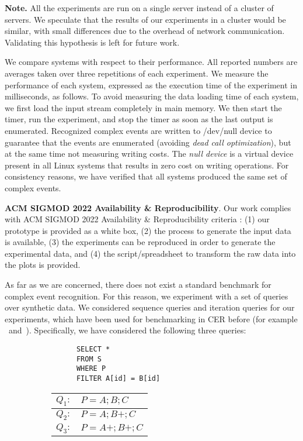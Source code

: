 \textbf{Note.} All the experiments are run on a single server instead of a cluster of servers. We speculate that the results of our experiments in a cluster would be similar, with small differences due to the overhead of network communication. Validating this hypothesis is left for future work.

We compare systems with respect to their performance. All reported numbers are averages taken over three repetitions of each experiment. We measure the performance of each system, expressed as the execution time of the experiment in milliseconds, as follows. To avoid measuring the data loading time of each system, we first load the input stream completely in main memory. We then start the timer, run the experiment, and stop the timer as soon as the last output is enumerated. Recognized complex events are written to /dev/null device to guarantee that the events are enumerated (avoiding \emph{dead call optimization}), but at the same time not measuring writing costs. The \emph{null device} is a virtual device present in all Linux systems that results in zero cost on writing operations. For consistency reasons, we have verified that all systems produced the same set of complex events.

\textbf{ACM SIGMOD 2022 Availability \& Reproducibility}. Our work complies with ACM SIGMOD 2022 Availability \& Reproducibility criteria \cite{acm-reprodocubility} : (1) our prototype is provided as a white box, (2) the process to generate the input data is available, (3) the experiments can be reproduced in order to generate the experimental data, and (4) the script/spreadsheet to transform the raw data into the plots is provided.

As far as we are concerned, there does not exist a standard benchmark for complex event recognition. For this reason, we experiment with a set of queries over synthetic data. We considered sequence queries and iteration queries for our experiments, which have been used for benchmarking in CER before (for example \cite{cayuga}~and~\cite{experiment-example}). Specifically, we have considered the following three queries:

\begin{figure}[H]
  \centering
  \begin{subfigure}[c]{0.49\textwidth}
    \centering
    \begin{verbatim}
      SELECT *
      FROM S
      WHERE P
      FILTER A[id] = B[id]
    \end{verbatim}
  \end{subfigure}
  \begin{subfigure}[t]{0.49\textwidth}
    \begin{tabular}{l l}
      \hline
      $Q_{1}:$ & $P = A;B;C$ \\
      \hline
      $Q_{2}:$ & $P = A;B+;C$ \\
      \hline
      $Q_{3}:$ & $P = A+;B+;C$ \\
      \hline
    \end{tabular}
  \end{subfigure}
\end{figure}

